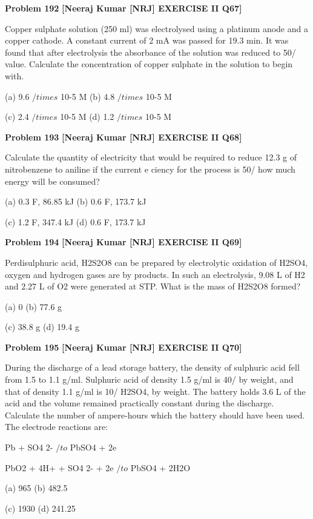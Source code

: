 \begin{problembox}
\textbf{Problem 192} \hfill \textbf{[Neeraj Kumar [NRJ] EXERCISE II Q67]}
\label{q:ext-nrj_all_questions-192}

Copper sulphate solution (250 ml) was electrolysed 
using a platinum anode and a copper cathode. A 
constant current of 2 mA was passed for 19.3 min. 
It was found that after electrolysis the absorbance 
of the solution was reduced to 50/%
value. Calculate the concentration of copper 
sulphate in the solution to begin with.
 
 (a) 9.6 $/times$ 10-5 M 
(b) 4.8 $/times$ 10-5 M
 
 (c) 2.4 $/times$ 10-5 M 
(d) 1.2 $/times$ 10-5 M
\end{problembox}

\begin{problembox}
\textbf{Problem 193} \hfill \textbf{[Neeraj Kumar [NRJ] EXERCISE II Q68]}
\label{q:ext-nrj_all_questions-193}

Calculate the quantity of electricity that would 
be required to reduce 12.3 g of nitrobenzene to 
aniline if the current e   ciency for the process is 
50/%
how much energy will be consumed?
 
 (a) 0.3 F, 86.85 kJ 
(b) 0.6 F, 173.7 kJ
 
 (c) 1.2 F, 347.4 kJ 
(d) 0.6 F, 173.7 kJ
\end{problembox}

\begin{problembox}
\textbf{Problem 194} \hfill \textbf{[Neeraj Kumar [NRJ] EXERCISE II Q69]}
\label{q:ext-nrj_all_questions-194}

Perdisulphuric acid, H2S2O8 can be prepared 
by electrolytic oxidation of H2SO4, oxygen 
and hydrogen gases are by products. In such an 
electrolysis, 9.08 L of H2 and 2.27 L of O2 were 
generated at STP. What is the mass of H2S2O8 
formed?
 
 (a) 0 
(b) 77.6 g
 
 (c) 38.8 g 
(d) 19.4 g
\end{problembox}

\begin{problembox}
\textbf{Problem 195} \hfill \textbf{[Neeraj Kumar [NRJ] EXERCISE II Q70]}
\label{q:ext-nrj_all_questions-195}

During the discharge of a lead storage battery, the 
density of sulphuric acid fell from 1.5 to 1.1 g/ml. 
Sulphuric acid of density 1.5 g/ml is 40/%
by weight, and that of density 1.1 g/ml is 10/%
H2SO4, by weight. The battery holds 3.6 L of the 
acid and the volume remained practically constant 
during the discharge. Calculate the number of 
ampere-hours which the battery should have been 
used. The electrode reactions are:
 
  Pb + SO4
2- $/to$ PbSO4 + 2e
 
   PbO2 + 4H+ + SO4
2- + 2e $/to$ PbSO4 + 2H2O
 
 (a) 965 
(b) 482.5
 
 (c) 1930 
(d) 241.25
\end{problembox}

